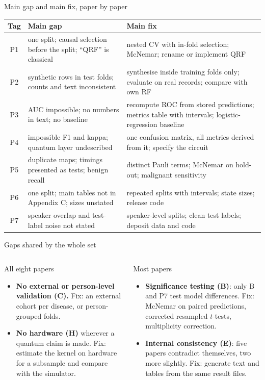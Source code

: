 \documentclass[aspectratio=169,10pt,t,xcolor={table}]{beamer}
\begin{document}
\begin{frame}{Main gap and main fix, paper by paper}
\centering\scriptsize
\begin{tabularx}{\textwidth}{c L{5.6cm} Y}
\toprule
Tag & Main gap & Main fix \\
\midrule
P1 & one split; causal selection before the split; ``QRF'' is classical & nested CV with in-fold selection; McNemar; rename or implement QRF \\
P2 & synthetic rows in test folds; counts and text inconsistent & synthesise inside training folds only; evaluate on real records; compare with own RF \\
P3 & AUC impossible; no numbers in text; no baseline & recompute ROC from stored predictions; metrics table with intervals; logistic-regression baseline \\
P4 & impossible F1 and kappa; quantum layer undescribed & one confusion matrix, all metrics derived from it; specify the circuit \\
P5 & duplicate maps; timings presented as tests; benign recall & distinct Pauli terms; McNemar on hold-out; malignant sensitivity \\
P6 & one split; main tables not in Appendix C; sizes unstated & repeated splits with intervals; state sizes; release code \\
P7 & speaker overlap and test-label noise not stated & speaker-level splits; clean test labels; deposit data and code \\
\bottomrule
\end{tabularx}
\end{frame}

\begin{frame}{Gaps shared by the whole set}
\begin{columns}[T]
\begin{alertblock}{All eight papers}
\footnotesize
\begin{itemize}
  \item \textbf{No external or person-level validation (C).} Fix: an external cohort per disease, or person-grouped folds.
  \item \textbf{No hardware (H)} wherever a quantum claim is made. Fix: estimate the kernel on hardware for a subsample and compare with the simulator.
\end{itemize}
\end{alertblock}
\begin{alertblock}{Most papers}
\footnotesize
\begin{itemize}
  \item \textbf{Significance testing (B)}: only B and P7 test model differences. Fix: McNemar on paired predictions, corrected resampled $t$-tests, multiplicity correction.
  \item \textbf{Internal consistency (E)}: five papers contradict themselves, two more slightly. Fix: generate text and tables from the same result files.
\end{itemize}
\end{alertblock}
\end{columns}
\end{frame}
\end{document}
